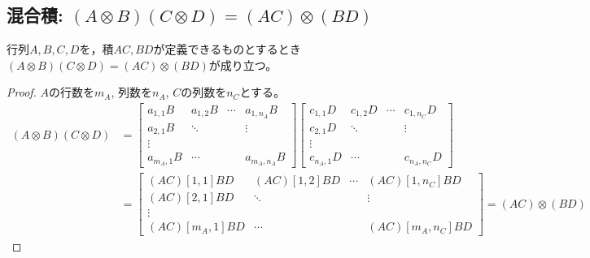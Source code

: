         \subsection{混合積: \texorpdfstring{$(A\otimes B)(C\otimes D) = (AC)\otimes(BD)$}{(A⊗B)(C⊗D) = (AC)⊗(BD)}}
            \begin{shadebox}
                行列$A,B,C,D$を，積$AC, BD$が定義できるものとするとき$(A\otimes B)(C\otimes D) = (AC)\otimes(BD)$が成り立つ。
            \end{shadebox}
            \begin{proof}
                \quad\par
                $A$の行数を$m_A$, 列数を$n_A$, $C$の列数を$n_C$とする。
                \begin{align*}
                    (A\otimes B)(C\otimes D) &= \begin{bmatrix}
                        a_{1,1}B & a_{1,2}B & \cdots & a_{1,n_A}B \\
                        a_{2,1}B & \ddots & & \vdots \\
                        \vdots \\
                        a_{m_A, 1}B & \cdots & & a_{m_A, n_A}B
                    \end{bmatrix}
                    \begin{bmatrix}
                        c_{1,1}D & c_{1,2}D & \cdots & c_{1,n_C}D \\
                        c_{2,1}D & \ddots & & \vdots \\
                        \vdots \\
                        c_{n_A, 1}D & \cdots & & c_{n_A, n_C}D
                    \end{bmatrix} \\
                    &= \begin{bmatrix}
                        (AC)[1,1]BD & (AC)[1,2]BD & \cdots & (AC)[1,n_C]BD \\
                        (AC)[2,1]BD & \ddots & & \vdots \\
                        \vdots \\
                        (AC)[m_A,1]BD & \cdots & & (AC)[m_A,n_C]BD
                    \end{bmatrix} = (AC)\otimes(BD)
                \end{align*}
            \end{proof}
